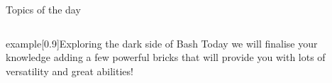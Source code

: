
\begin{frame}
    \titlepage
\end{frame}
\begin{frame}[label=toc,plain,noframenumbering]{Topics of the day}
    \medskip
    \begin{columns}[t]
        \begin{column}{.45\textwidth}
            \hspace*{4mm}
            \begin{minipage}[t][0.45\textheight]{\textwidth}
                \tableofcontents[sections={1-4}]
            \end{minipage}
        \end{column}
        \begin{column}{.45\textwidth}
            \begin{minipage}[t][0.45\textheight]{\textwidth}
                \tableofcontents[sections={5-}]
            \end{minipage}
        \end{column}
    \end{columns}
    \vspace{6mm}
    \begin{varblock}{example}[0.9\textwidth]{Exploring the dark side of Bash}
        Today we will finalise your knowledge adding a few powerful bricks that will provide you with lots of versatility and great abilities!
    \end{varblock}
\end{frame}
